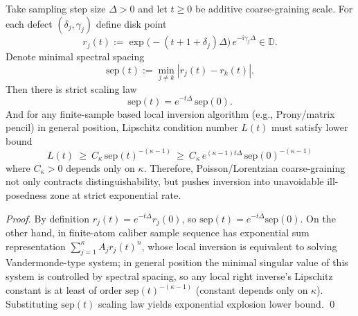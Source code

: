 \begin{proposition}\label{prop:xi-coarsegraining-illposedness-exponential-law}
Take sampling step size \(\Delta>0\) and let \(t\ge 0\) be additive coarse-graining scale.
For each defect \((\delta_j,\gamma_j)\) define disk point
\[
r_j(t):=\exp\!\bigl(-(t+1+\delta_j)\Delta\bigr)\,e^{-\mathrm{i}\gamma_j\Delta}\in\mathbb{D}.
\]
Denote minimal spectral spacing
\[
\mathrm{sep}(t):=\min_{j\ne k}|r_j(t)-r_k(t)|.
\]
Then there is strict scaling law
\[
\boxed{\;\mathrm{sep}(t)=e^{-t\Delta}\,\mathrm{sep}(0).\;}
\]
And for any finite-sample based local inversion algorithm (e.g., Prony/matrix pencil) in general position, Lipschitz condition number \(L(t)\) must satisfy lower bound
\[
\boxed{\;
L(t)\ \ge\ C_\kappa\,\mathrm{sep}(t)^{-(\kappa-1)}
\ \ge\ C_\kappa\,e^{(\kappa-1)t\Delta}\,\mathrm{sep}(0)^{-(\kappa-1)}\;}
\]
where \(C_\kappa>0\) depends only on \(\kappa\).
Therefore, Poisson/Lorentzian coarse-graining not only contracts distinguishability, but pushes inversion into unavoidable ill-posedness zone at strict exponential rate.
\end{proposition}
\begin{proof}
By definition \(r_j(t)=e^{-t\Delta}r_j(0)\), so \(\mathrm{sep}(t)=e^{-t\Delta}\mathrm{sep}(0)\).
On the other hand, in finite-atom caliber sample sequence has exponential sum representation \(\sum_{j=1}^{\kappa}A_j r_j(t)^n\), whose local inversion is equivalent to solving Vandermonde-type system; in general position the minimal singular value of this system is controlled by spectral spacing, so any local right inverse's Lipschitz constant is at least of order \(\mathrm{sep}(t)^{-(\kappa-1)}\) (constant depends only on \(\kappa\)).
Substituting \(\mathrm{sep}(t)\) scaling law yields exponential explosion lower bound. \qed
\end{proof}

